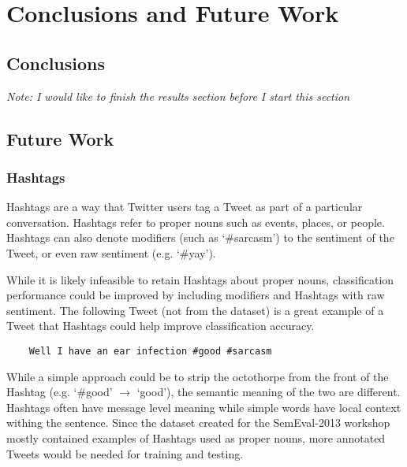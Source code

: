 \documentclass[final,3p,12pt]{elsarticle}
\begin{document}
\section{Conclusions and Future Work}
\label{section:conclusionsandfuturework}

\subsection{Conclusions}
\label{ssection:conclusions}

\textit{Note: I would like to finish the results section before I start this section }


\subsection{Future Work}
\label{ssection:futurework}

\subsubsection{Hashtags}
\label{sssection:hashtags}

Hashtags are a way that Twitter users tag a Tweet as part of a particular
conversation. Hashtags refer to proper nouns such as events, places, or people.
Hashtags can also denote modifiers (such as `\#sarcasm') to the sentiment of the
Tweet, or even raw sentiment (e.g. `\#yay').

While it is likely infeasible to retain Hashtags about proper nouns,
classification performance could be improved by including modifiers and
Hashtags with raw sentiment. The following Tweet (not from the dataset) is a
great example of a Tweet that Hashtags could help improve classification
accuracy.

\begin{verbatim}
    Well I have an ear infection #good #sarcasm
\end{verbatim}

While a simple approach could be to strip the octothorpe from the front of the
Hashtag (e.g. `\#good' $\rightarrow$ `good'), the semantic meaning of the two
are different. Hashtags often have message level meaning while simple words
have local context withing the sentence. Since the dataset created for the
SemEval-2013 workshop mostly contained examples of Hashtags used as proper
nouns, more annotated Tweets would be needed for training and testing.
\end{document}
